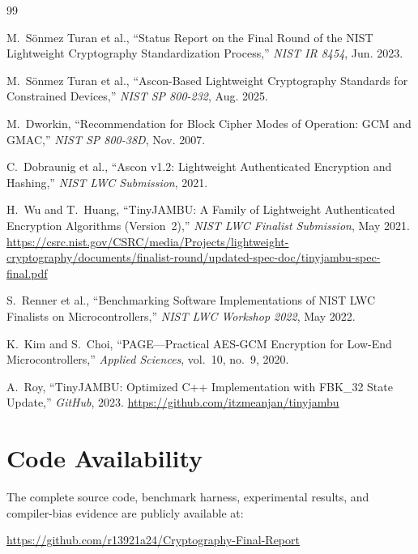\documentclass[11pt,a4paper]{article}
\begin{document}
\begin{thebibliography}{99}

M.~S\"{o}nmez Turan et al., ``Status Report on the Final Round of the NIST Lightweight Cryptography Standardization Process,'' \emph{NIST IR 8454}, Jun. 2023.

M.~S\"{o}nmez Turan et al., ``Ascon-Based Lightweight Cryptography Standards for Constrained Devices,'' \emph{NIST SP 800-232}, Aug. 2025.

M.~Dworkin, ``Recommendation for Block Cipher Modes of Operation: GCM and GMAC,'' \emph{NIST SP 800-38D}, Nov. 2007.

C.~Dobraunig et al., ``Ascon v1.2: Lightweight Authenticated Encryption and Hashing,'' \emph{NIST LWC Submission}, 2021.

H.~Wu and T.~Huang, ``TinyJAMBU: A Family of Lightweight Authenticated Encryption Algorithms (Version~2),'' \emph{NIST LWC Finalist Submission}, May 2021. \url{https://csrc.nist.gov/CSRC/media/Projects/lightweight-cryptography/documents/finalist-round/updated-spec-doc/tinyjambu-spec-final.pdf}

S.~Renner et al., ``Benchmarking Software Implementations of NIST LWC Finalists on Microcontrollers,'' \emph{NIST LWC Workshop 2022}, May 2022.

K.~Kim and S.~Choi, ``PAGE---Practical AES-GCM Encryption for Low-End Microcontrollers,'' \emph{Applied Sciences}, vol.~10, no.~9, 2020.

A.~Roy, ``TinyJAMBU: Optimized C++ Implementation with FBK\_32 State Update,'' \emph{GitHub}, 2023. \url{https://github.com/itzmeanjan/tinyjambu}

\end{thebibliography}

\appendix
\section{Code Availability}

The complete source code, benchmark harness, experimental results, and compiler-bias evidence are publicly available at:

\begin{center}
\url{https://github.com/r13921a24/Cryptography-Final-Report}
\end{center}
\end{document}
